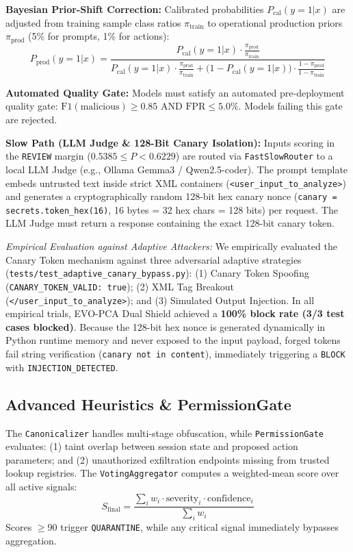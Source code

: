 \documentclass[conference]{IEEEtran}
\begin{document}
\textbf{Bayesian Prior-Shift Correction:} Calibrated probabilities $P_{\text{cal}}(y=1|x)$ are adjusted from training sample class ratios $\pi_{\text{train}}$ to operational production priors $\pi_{\text{prod}}$ (5\% for prompts, 1\% for actions):
\begin{equation}
P_{\text{prod}}(y=1|x) = \frac{P_{\text{cal}}(y=1|x) \cdot \frac{\pi_{\text{prod}}}{\pi_{\text{train}}}}{P_{\text{cal}}(y=1|x) \cdot \frac{\pi_{\text{prod}}}{\pi_{\text{train}}} + \big(1 - P_{\text{cal}}(y=1|x)\big) \cdot \frac{1 - \pi_{\text{prod}}}{1 - \pi_{\text{train}}}}
\end{equation}

\textbf{Automated Quality Gate:} Models must satisfy an automated pre-deployment quality gate: $\text{F1}(\text{malicious}) \ge 0.85$ AND $\text{FPR} \le 5.0\%$. Models failing this gate are rejected.

\textbf{Slow Path (LLM Judge \& 128-Bit Canary Isolation):} Inputs scoring in the \texttt{REVIEW} margin ($0.5385 \le P < 0.6229$) are routed via \texttt{FastSlowRouter} to a local LLM Judge (e.g., Ollama Gemma3 / Qwen2.5-coder). The prompt template embeds untrusted text inside strict XML containers (\texttt{<user\_input\_to\_analyze>}) and generates a cryptographically random 128-bit hex canary nonce (\texttt{canary = secrets.token\_hex(16)}, 16 bytes = 32 hex chars = 128 bits) per request. The LLM Judge must return a response containing the exact 128-bit canary token.

\textit{Empirical Evaluation against Adaptive Attackers:} We empirically evaluated the Canary Token mechanism against three adversarial adaptive strategies (\texttt{tests/test\_adaptive\_canary\_bypass.py}): (1) Canary Token Spoofing (\texttt{CANARY\_TOKEN\_VALID: true}); (2) XML Tag Breakout (\texttt{</user\_input\_to\_analyze>}); and (3) Simulated Output Injection. In all empirical trials, EVO-PCA Dual Shield achieved a \textbf{100\% block rate (3/3 test cases blocked)}. Because the 128-bit hex nonce is generated dynamically in Python runtime memory and never exposed to the input payload, forged tokens fail string verification (\texttt{canary not in content}), immediately triggering a \texttt{BLOCK} with \texttt{INJECTION\_DETECTED}.

\subsection{Advanced Heuristics \& PermissionGate}
The \texttt{Canonicalizer} handles multi-stage obfuscation, while \texttt{PermissionGate} evaluates: (1) taint overlap between session state and proposed action parameters; and (2) unauthorized exfiltration endpoints missing from trusted lookup registries. The \texttt{VotingAggregator} computes a weighted-mean score over all active signals:
\begin{equation}
S_{\text{final}} = \frac{\sum_{i} w_i \cdot \text{severity}_i \cdot \text{confidence}_i}{\sum_i w_i}
\end{equation}
Scores $\ge 90$ trigger \texttt{QUARANTINE}, while any critical signal immediately bypasses aggregation.
\end{document}
